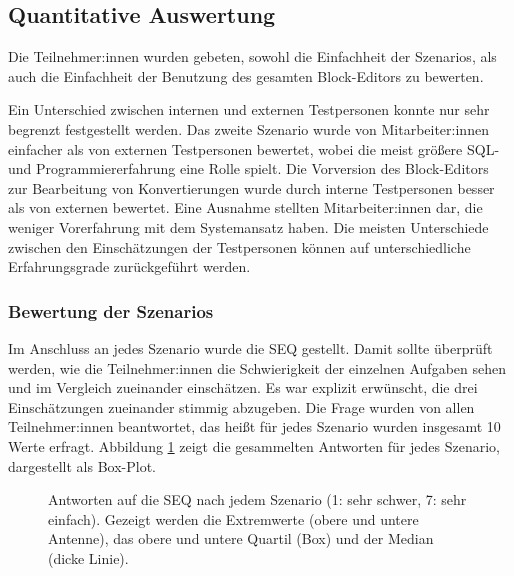 \subsection{Quantitative Auswertung}
\label{sec:quantitative}

Die Teilnehmer:innen wurden gebeten, sowohl die Einfachheit der Szenarios, als auch die Einfachheit der Benutzung des gesamten Block-Editors zu bewerten.

Ein Unterschied zwischen internen und externen Testpersonen konnte nur sehr begrenzt festgestellt werden. Das zweite Szenario wurde von Mitarbeiter:innen einfacher als von externen Testpersonen bewertet, wobei die meist größere \ac{SQL}- und Programmiererfahrung eine Rolle spielt. Die Vorversion des Block-Editors zur Bearbeitung von Konvertierungen wurde durch interne Testpersonen besser als von externen bewertet. Eine Ausnahme stellten Mitarbeiter:innen dar, die weniger Vorerfahrung mit dem Systemansatz haben. Die meisten Unterschiede zwischen den Einschätzungen der Testpersonen können auf unterschiedliche  Erfahrungsgrade zurückgeführt werden.

\subsubsection{Bewertung der Szenarios}

Im Anschluss an jedes Szenario wurde die \ac{SEQ} gestellt. Damit sollte überprüft werden, wie die Teilnehmer:innen die Schwierigkeit der einzelnen Aufgaben sehen und im Vergleich zueinander einschätzen. Es war explizit erwünscht, die drei Einschätzungen zueinander stimmig abzugeben. Die Frage wurden von allen Teilnehmer:innen beantwortet, das heißt für jedes Szenario wurden insgesamt 10 Werte erfragt. Abbildung \ref{fig:seq} zeigt die gesammelten Antworten für jedes Szenario, dargestellt als Box-Plot.

\begin{figure}[!ht]
  \datatable
  \centering
  \caption[Antworten auf die SEQ nach jedem Szenario]{Antworten auf die \acs{SEQ} nach jedem Szenario (1: sehr schwer, 7: sehr einfach). Gezeigt werden die Extremwerte (obere und untere Antenne), das obere und untere Quartil (Box) und der Median (dicke Linie).}
  \label{fig:seq}
\end{figure}

